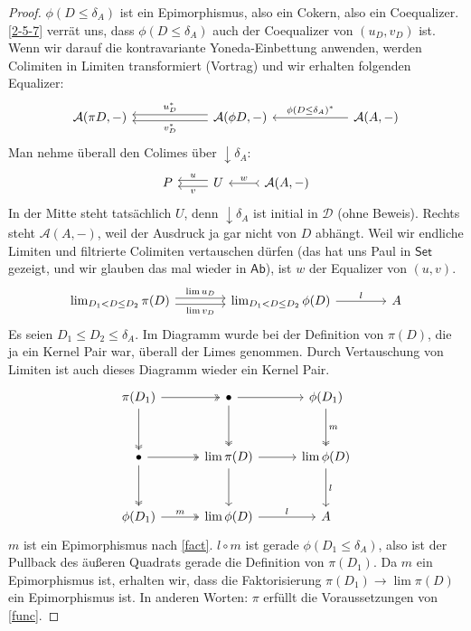 \documentclass[a4paper, parskip=half]{scrartcl}
\theoremstyle{marginbreak}
\theoremstyle{nonumberplain}
\newtheorem{proof}{Beweis.}
\newcommand\ccat\mathsf
\newcommand\cat\mathcal
\newcommand{\down}[1]{{\downarrow}#1}
\newcommand{\n}{\pgfmatrixnextcell}
\begin{document}
{\begin{proof}
			$\phi(D\leq\delta_A)$ ist ein Epimorphismus, also ein Cokern, also ein
			Coequalizer. \ref{2-5-7} verrät uns, dass $\phi(D\leq\delta_A)$ auch der
			Coequalizer von $(u_D, v_D)$ ist. Wenn wir darauf die kontravariante
			Yoneda-Einbettung anwenden, werden Colimiten in Limiten transformiert
			(Vortrag) und wir erhalten folgenden Equalizer:
			\[
				\begin{tikzcd}[column sep=6em]
					\cat{A}(\pi D,{-}) \n
					\cat{A}(\phi D, {-})
						\ar[shift right, ']{l}{u_D^*}
						\ar[shift left]{l}{v_D^*} \n
					\cat{A}(A, {-})
						\ar[']{l}{\phi(D\leq\delta_A)^*}
				\end{tikzcd}
			\]
			Man nehme überall den Colimes über $\down{\delta_A}$:
			\[
				\begin{tikzcd}
					P \n
					U
						\ar[shift right, ']{l}{u}
						\ar[shift left]{l}{v} \n
					\cat{A}(A,{-})
						\ar[tail,']{l}{w}
				\end{tikzcd}
			\]
			In der Mitte steht tatsächlich $U$, denn $\down{\delta_A}$ ist
			initial in $\cat{D}$ (ohne Beweis). Rechts steht
			$\cat{A}(A,{-})$, weil der Ausdruck ja gar nicht von $D$ abhängt.
			Weil wir endliche Limiten und filtrierte Colimiten vertauschen dürfen
			(das hat uns Paul in $\ccat{Set}$ gezeigt, und wir glauben das mal wieder
			in $\ccat{Ab}$), ist $w$ der Equalizer von $(u, v)$.
			\[
				\begin{tikzcd}[column sep=4em]
					\lim_{D_1<D\leq D_2}\pi(D)
						\ar[shift left]{r}{\lim u_D}
						\ar[shift right, ']{r}{\lim v_D} \n
					\lim_{D_1<D\leq D_2}\phi(D)
						\ar{r}{l} \n
					A
				\end{tikzcd}
			\]
			Es seien $D_1\leq D_2\leq\delta_A$. Im Diagramm wurde bei der Definition
			von $\pi(D)$, die ja ein Kernel Pair war, überall der Limes genommen.
			Durch Vertauschung von Limiten ist auch dieses Diagramm wieder ein
			Kernel Pair.
			\[
				\begin{tikzcd}[sep=3em]
					\pi(D_1)
						\ar[two heads]{r}{}
						\ar[two heads]{d}{} \n
					\bullet
						\ar{r}{}
						\ar[two heads]{d}{} \n
					\phi(D_1)
						\ar[two heads]{d}{m} \\
					\bullet
						\ar[two heads]{r}{}
						\ar[two heads]{d}{} \n
					\lim\pi(D)
						\ar{r}{}
						\ar{d}{} \n
					\lim\phi(D)
						\ar{d}{l} \\
					\phi(D_1)
						\ar[two heads]{r}{m} \n
					\lim\phi(D)
						\ar{r}{l} \n
					A
				\end{tikzcd}
			\]
			$m$ ist ein Epimorphismus nach \ref{fact}. $l\circ m$ ist gerade
			$\phi(D_1\leq\delta_A)$, also ist der Pullback des äußeren Quadrats
			gerade die Definition von $\pi(D_1)$. Da $m$ ein Epimorphismus ist,
			erhalten wir, dass die Faktorisierung $\pi(D_1)\to\lim\pi(D)$ ein
			Epimorphismus ist. In anderen Worten: $\pi$ erfüllt die Voraussetzungen
			von \ref{func}.


\end{proof}}
\end{document}
